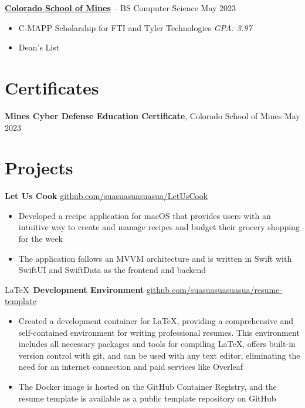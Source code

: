 \documentclass[11pt]{article}       %
\begin{document}
\vspace{-6.5pt}

\textbf{\href{https://cs.mines.edu}{Colorado School of Mines}} -- BS Computer Science \hfill May 2023 \\
\vspace{-11.5pt}
\begin{itemize}
	\itemsep -0.5em
	\item C-MAPP Scholarship for FTI and Tyler Technologies \hfill \textit{GPA: 3.97}
	\item Dean's List \hfill
\end{itemize}

\vspace{-18.5pt}

\section*{Certificates}
\textbf{Mines Cyber Defense Education Certificate}, {Colorado School of Mines} \hfill May 2023 \\

\vspace{-6.5pt}

\section*{Projects}
\textbf{Let Us Cook} \hfill \href{https://github.com/suasuasuasuasua/LetUsCook}{github.com/suasuasuasuasua/LetUsCook} \\
\vspace{-9pt}
\begin{itemize}
	\item Developed a recipe application for macOS that provides users with an
	      intuitive way to create and manage recipes and budget their grocery
	      shopping for the week
	\item The application follows an MVVM architecture and is written in Swift
	      with SwiftUI and SwiftData as the frontend and backend
\end{itemize}

\LaTeX \, \textbf{Development Environment} \hfill
\href{https://github.com/suasuasuasuasua/resume-template}{github.com/suasuasuasuasua/resume-template}
\\
\vspace{-9pt}
\begin{itemize}
	\item Created a development container for \LaTeX, providing a
	      comprehensive and self-contained environment for writing
	      professional resumes. This environment includes all necessary
	      packages and tools for compiling \LaTeX, offers built-in version
	      control with git, and can be used with any text editor, eliminating
	      the need for an internet connection and paid services like Overleaf
	\item The Docker image is hosted on the GitHub Container Registry, and the
	      resume template is available as a public template repository on
	      GitHub
\end{itemize}
\end{document}
